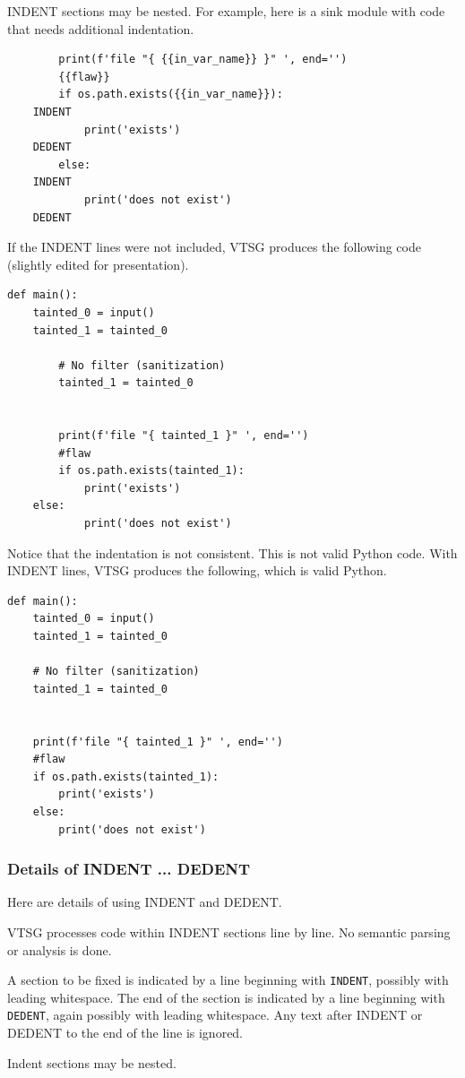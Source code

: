 INDENT sections may be nested.  For example, here is a sink module with code that
needs additional indentation.
\begin{verbatim}
        print(f'file "{ {{in_var_name}} }" ', end='')
        {{flaw}}
        if os.path.exists({{in_var_name}}):
	INDENT
            print('exists')
	DEDENT
        else:
	INDENT
            print('does not exist')
	DEDENT
\end{verbatim}
If the INDENT lines were not included, VTSG produces the following code (slightly
edited for presentation).
\begin{verbatim}
def main():
    tainted_0 = input()
    tainted_1 = tainted_0
    
        # No filter (sanitization)
        tainted_1 = tainted_0
            
    
        print(f'file "{ tainted_1 }" ', end='')
        #flaw
        if os.path.exists(tainted_1):
            print('exists')
	else:
            print('does not exist')
\end{verbatim}
Notice that the indentation is not consistent. This is not valid Python code.
With INDENT lines, VTSG produces the following, which is valid Python.
\begin{verbatim}
def main():
    tainted_0 = input()
    tainted_1 = tainted_0

    # No filter (sanitization)
    tainted_1 = tainted_0


    print(f'file "{ tainted_1 }" ', end='')
    #flaw
    if os.path.exists(tainted_1):
        print('exists')
    else:
        print('does not exist')
\end{verbatim}


\subsubsection{Details of INDENT ... DEDENT}

Here are details of using INDENT and DEDENT.

VTSG processes code within INDENT sections line by line. No semantic parsing or
analysis is done.

A section to be fixed is indicated by a line beginning with \verb|INDENT|, possibly
with leading whitespace. The end of the section is indicated by a line beginning with
\verb|DEDENT|, again possibly with leading whitespace. Any text after INDENT or
DEDENT to the end of the line is ignored.

Indent sections may be nested.

